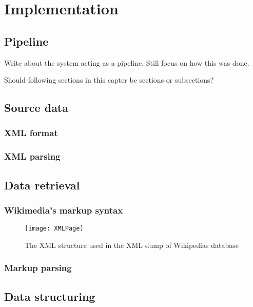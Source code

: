 
\chapter{Implementation}\label{cap_4}

\section{Pipeline}

Write about the system acting as a pipeline.
Still focus on how this was done.

Should following sections in this capter be sections or subsections?

\section{Source data}


\subsection{XML format}


\subsection{XML parsing}


\section{Data retrieval}

\subsection{Wikimedia's markup syntax}
\begin{figure}[h]
\caption{The XML structure used in the XML dump of Wikipedias database}
\texttt{[image: XMLPage]}
\end{figure}

\subsection{Markup parsing}


\section{Data structuring}

